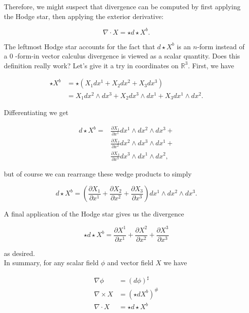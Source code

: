 \documentclass[10pt]{article}
\begin{document}
Therefore, we might suspect that divergence can be computed by first applying the Hodge star, then applying the exterior derivative:

$$
\nabla \cdot X=\star d \star X^{b} .
$$

The leftmost Hodge star accounts for the fact that $d \star X^{b}$ is an $n$-form instead of a 0 -form-in vector calculus divergence is viewed as a scalar quantity. Does this definition really work? Let's give it a try in coordinates on $\mathbb{R}^{3}$. First, we have

$$
\begin{aligned}
\star X^{b} & =\star\left(X_{1} d x^{1}+X_{2} d x^{2}+X_{3} d x^{3}\right) \\
& =X_{1} d x^{2} \wedge d x^{3}+X_{2} d x^{3} \wedge d x^{1}+X_{3} d x^{1} \wedge d x^{2} .
\end{aligned}
$$

Differentiating we get

$$
\begin{aligned}
d \star X^{b}= & \frac{\partial X_{1}}{\partial x^{1}} d x^{1} \wedge d x^{2} \wedge d x^{3}+ \\
& \frac{\partial X_{2}}{\partial x^{2}} d x^{2} \wedge d x^{3} \wedge d x^{1}+ \\
& \frac{\partial X_{3}}{\partial x^{3}} d x^{3} \wedge d x^{1} \wedge d x^{2},
\end{aligned}
$$

but of course we can rearrange these wedge products to simply

$$
d \star X^{b}=\left(\frac{\partial X_{1}}{\partial x^{1}}+\frac{\partial X_{2}}{\partial x^{2}}+\frac{\partial X_{3}}{\partial x^{3}}\right) d x^{1} \wedge d x^{2} \wedge d x^{3} .
$$

A final application of the Hodge star gives us the divergence

$$
\star d \star X^{b}=\frac{\partial X^{1}}{\partial x^{1}}+\frac{\partial X^{2}}{\partial x^{2}}+\frac{\partial X^{3}}{\partial x^{3}}
$$

as desired.\\
In summary, for any scalar field $\phi$ and vector field $X$ we have

$$
\begin{aligned}
\nabla \phi & =(d \phi)^{\sharp} \\
\nabla \times X & =\left(\star d X^{b}\right)^{\#} \\
\nabla \cdot X & =\star d \star X^{b}
\end{aligned}
$$
\end{document}
